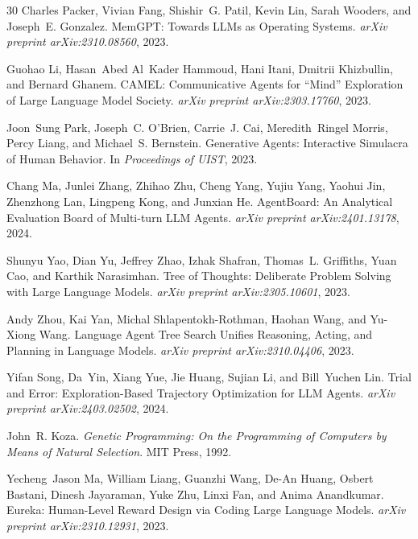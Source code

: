 \documentclass{article}
\begin{document}
\begin{thebibliography}{30}
Charles Packer, Vivian Fang, Shishir~G. Patil, Kevin Lin, Sarah Wooders, and Joseph~E. Gonzalez.
\newblock MemGPT: Towards LLMs as Operating Systems.
\newblock \textit{arXiv preprint arXiv:2310.08560}, 2023.

Guohao Li, Hasan~Abed Al~Kader Hammoud, Hani Itani, Dmitrii Khizbullin, and Bernard Ghanem.
\newblock CAMEL: Communicative Agents for ``Mind'' Exploration of Large Language Model Society.
\newblock \textit{arXiv preprint arXiv:2303.17760}, 2023.

Joon~Sung Park, Joseph~C. O'Brien, Carrie~J. Cai, Meredith~Ringel Morris, Percy Liang, and Michael~S. Bernstein.
\newblock Generative Agents: Interactive Simulacra of Human Behavior.
\newblock In \textit{Proceedings of UIST}, 2023.

Chang Ma, Junlei Zhang, Zhihao Zhu, Cheng Yang, Yujiu Yang, Yaohui Jin, Zhenzhong Lan, Lingpeng Kong, and Junxian He.
\newblock AgentBoard: An Analytical Evaluation Board of Multi-turn LLM Agents.
\newblock \textit{arXiv preprint arXiv:2401.13178}, 2024.

Shunyu Yao, Dian Yu, Jeffrey Zhao, Izhak Shafran, Thomas~L. Griffiths, Yuan Cao, and Karthik Narasimhan.
\newblock Tree of Thoughts: Deliberate Problem Solving with Large Language Models.
\newblock \textit{arXiv preprint arXiv:2305.10601}, 2023.

Andy Zhou, Kai Yan, Michal Shlapentokh-Rothman, Haohan Wang, and Yu-Xiong Wang.
\newblock Language Agent Tree Search Unifies Reasoning, Acting, and Planning in Language Models.
\newblock \textit{arXiv preprint arXiv:2310.04406}, 2023.

Yifan Song, Da~Yin, Xiang Yue, Jie Huang, Sujian Li, and Bill~Yuchen Lin.
\newblock Trial and Error: Exploration-Based Trajectory Optimization for LLM Agents.
\newblock \textit{arXiv preprint arXiv:2403.02502}, 2024.

John~R. Koza.
\newblock \textit{Genetic Programming: On the Programming of Computers by Means of Natural Selection}.
\newblock MIT Press, 1992.

Yecheng~Jason Ma, William Liang, Guanzhi Wang, De-An Huang, Osbert Bastani, Dinesh Jayaraman, Yuke Zhu, Linxi Fan, and Anima Anandkumar.
\newblock Eureka: Human-Level Reward Design via Coding Large Language Models.
\newblock \textit{arXiv preprint arXiv:2310.12931}, 2023.


\end{thebibliography}
\end{document}
